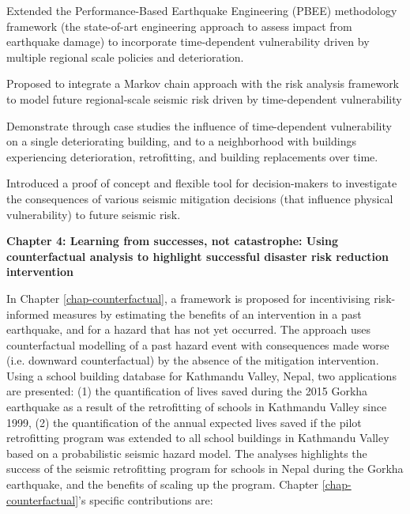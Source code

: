 \begin{enumerate}
Extended the Performance-Based Earthquake Engineering (PBEE) methodology \citep{krawinkler2004performance} framework (the state-of-art engineering approach to assess impact from earthquake damage) to incorporate time-dependent vulnerability driven by multiple regional scale policies and deterioration. 

Proposed to integrate a Markov chain approach with the risk analysis framework to model future regional-scale seismic risk driven by time-dependent vulnerability

Demonstrate through case studies the influence of time-dependent vulnerability on a single deteriorating building, and to a neighborhood with buildings experiencing deterioration, retrofitting, and building replacements over time.

Introduced a proof of concept and flexible tool for decision-makers to investigate the consequences of various seismic mitigation decisions (that influence physical vulnerability) to future seismic risk. 


\end{enumerate}


\vspace{1cm}
\noindent
\textbf{Chapter 4: Learning from successes, not catastrophe: Using counterfactual analysis to highlight successful disaster risk reduction intervention}
\noindent

In Chapter \ref{chap-counterfactual}, a framework is proposed for incentivising risk-informed measures by estimating the benefits of an intervention in a past earthquake, and for a hazard that has not yet occurred. The approach uses counterfactual modelling of a past hazard event with consequences made worse (i.e. downward counterfactual) by the absence of the mitigation intervention. Using a school building database for Kathmandu Valley, Nepal, two applications are presented: (1) the quantification of lives saved during the 2015 Gorkha earthquake as a result of the retrofitting of schools in Kathmandu Valley since 1999, (2) the quantification of the annual expected lives saved if the pilot retrofitting program was extended to all school buildings in Kathmandu Valley based on a probabilistic seismic hazard model. The analyses highlights the success of the seismic retrofitting program for schools in Nepal during the Gorkha earthquake, and the benefits of scaling up the program. Chapter \ref{chap-counterfactual}'s specific contributions are:

